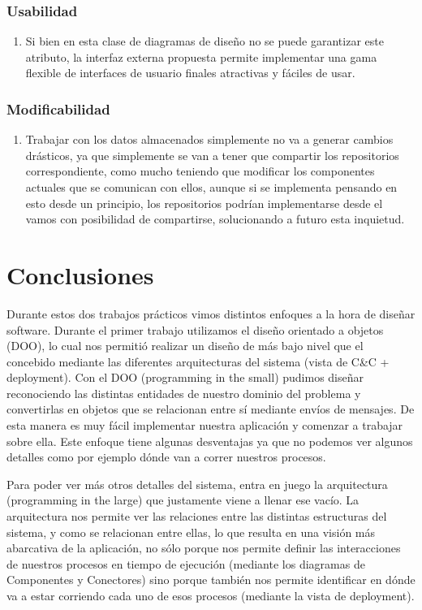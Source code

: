 \documentclass{article}
\theoremstyle{definition}
\theoremstyle{remark}
\begin{document}
\subsubsection{Usabilidad}

\begin{enumerate}
  \item Si bien en esta clase de diagramas de diseño no se puede garantizar este atributo, la interfaz externa propuesta permite implementar una gama flexible de interfaces de usuario finales atractivas y fáciles de usar.
\end{enumerate}

\subsubsection{Modificabilidad}

\begin{enumerate}
  \item Trabajar con los datos almacenados simplemente no va a generar cambios drásticos, ya que simplemente se van a tener que compartir los repositorios correspondiente, como mucho teniendo que modificar los componentes actuales que se comunican con ellos, aunque si se implementa pensando en esto desde un principio, los repositorios podrían implementarse desde el vamos con posibilidad de compartirse, solucionando a futuro esta inquietud.
\end{enumerate}

\pagebreak

\section{Conclusiones}

Durante estos dos trabajos prácticos vimos distintos enfoques a la hora de diseñar software. Durante el primer trabajo utilizamos el diseño orientado a objetos (DOO), lo cual nos permitió realizar un diseño de más bajo nivel que el concebido mediante las diferentes arquitecturas del sistema (vista de C\&C + deployment). Con el DOO (programming in the small) pudimos diseñar reconociendo las distintas entidades de nuestro dominio del problema y convertirlas en objetos que se relacionan entre sí mediante envíos de mensajes. De esta manera es muy fácil implementar nuestra aplicación y comenzar a trabajar sobre ella. Este enfoque tiene algunas desventajas ya que no podemos ver algunos detalles como por ejemplo dónde van a correr nuestros procesos.

Para poder ver más otros detalles del sistema, entra en juego la arquitectura (programming in the large) que justamente viene a llenar ese vacío. La arquitectura nos permite ver las relaciones entre las distintas estructuras del sistema, y como se relacionan entre ellas, lo que resulta en una visión más abarcativa de la aplicación, no sólo porque nos permite definir las interacciones de nuestros procesos en tiempo de ejecución (mediante los diagramas de Componentes y Conectores) sino porque también nos permite identificar en dónde va a estar corriendo cada uno de esos procesos (mediante la vista de deployment).
\end{document}
